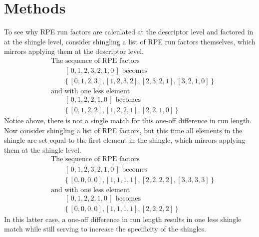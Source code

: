 \documentclass[letter]{article}
\begin{document}
\section{Methods}

To see why RPE run factors are calculated at the descriptor level and factored in at the shingle level, consider shingling a list of RPE run factors themselves, which mirrors applying them at the descriptor level. 
\begin{align*}
    &\text{The sequence of RPE factors} \\
    &\qquad[\, 0, 1, 2, 3, 2, 1, 0 \,] \text{ becomes} \\
    &\qquad\{\, [0, 1, 2, 3], [1, 2, 3, 2], [2, 3, 2, 1], [3, 2, 1, 0] \,\} \\
    &\text{and with one less element} \\
    &\qquad[\, 0, 1, 2, 2, 1, 0 \,] \text{ becomes} \\
    &\qquad\{\, [0, 1, 2, 2], [1, 2, 2, 1], [2, 2, 1, 0] \,\}
\end{align*}
Notice above, there is not a single match for this one-off difference in run length.
Now consider shingling a list of RPE factors, but this time all elements in the shingle are set equal to the first element in the shingle, which mirrors applying them at the shingle level. 
\begin{align*}
    &\text{The sequence of RPE factors} \\
    &\qquad[\, 0, 1, 2, 3, 2, 1, 0 \,] \text{ becomes} \\
    &\qquad\{\, [0, 0, 0, 0], [1, 1, 1, 1], [2, 2, 2, 2], [3, 3, 3, 3] \,\} \\
    &\text{and with one less element} \\
    &\qquad[\, 0, 1, 2, 2, 1, 0 \,] \text{ becomes} \\
    &\qquad\{\, [0, 0, 0, 0], [1, 1, 1, 1], [2, 2, 2, 2] \,\}
\end{align*}
In this latter case, a one-off difference in run length results in one less shingle match while still serving to increase the specificity of the shingles. 
\end{document}
